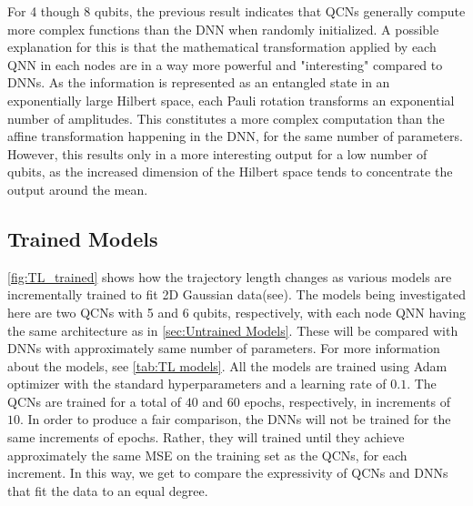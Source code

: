 For 4 though 8 qubits, the previous result indicates that QCNs generally compute more complex functions than the DNN when randomly initialized. A possible explanation for this is that the mathematical transformation applied by each QNN in each nodes are in a way more powerful and "interesting" compared to DNNs. As the information is represented as an entangled state in an exponentially large Hilbert space, each Pauli rotation transforms an exponential number of amplitudes. This constitutes a more complex computation than the affine transformation happening in the DNN, for the same number of parameters. However, this results only in a more interesting output for a low number of qubits, as the increased dimension of the Hilbert space tends to concentrate the output around the mean. 


\subsection{Trained Models}\label{sec:Trained Models}
\autoref{fig:TL_trained} shows how the trajectory length changes as various models are incrementally trained to fit 2D Gaussian data(see). The models being investigated here are two QCNs with 5 and 6 qubits, respectively, with each node QNN having the same architecture as in \autoref{sec:Untrained Models}. These will be compared with DNNs with approximately same number of parameters. For more information about the models, see \autoref{tab:TL models}. All the models are trained using Adam optimizer with the standard hyperparameters and a learning rate of $0.1$. The QCNs are trained for a total of $40$ and $60$ epochs, respectively, in increments of $10$. In order to produce a fair comparison, the DNNs will not be trained for the same increments of epochs. Rather, they will trained until they achieve approximately the same MSE on the training set as the QCNs, for each increment. In this way, we get to compare the expressivity of QCNs and DNNs that fit the data to an equal degree. 

